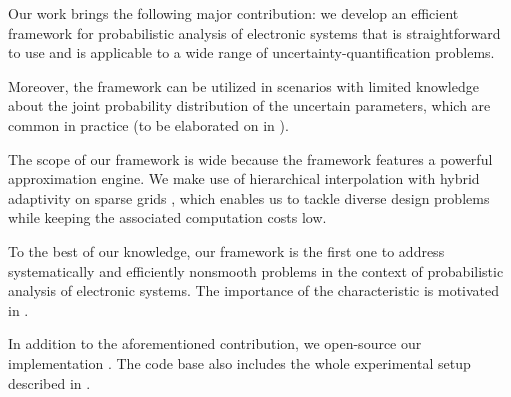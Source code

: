 Our work brings the following major contribution: we develop an efficient
framework for probabilistic analysis of electronic systems that is
straightforward to use and is applicable to a wide range of
uncertainty-quantification problems.

 Moreover, the
framework can be utilized in scenarios with limited knowledge about the joint
probability distribution of the uncertain parameters, which are common in
practice (to be elaborated on in ).

The scope of our framework is wide because the framework features a powerful
approximation engine. We make use of hierarchical interpolation with hybrid
adaptivity on sparse grids \cite{jakeman2012, klimke2006, ma2009}, which enables
us to tackle diverse design problems while keeping the associated computation
costs low.

To the best of our knowledge, our framework is the first one to address
systematically and efficiently nonsmooth problems in the context of
probabilistic analysis of electronic systems. The importance of the
characteristic is motivated in .

In addition to the aforementioned contribution, we open-source our
implementation \cite{sources}. The code base also includes the whole
experimental setup described in .
